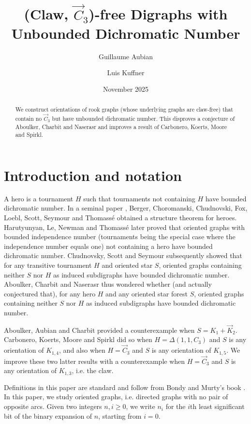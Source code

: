 \documentclass{amsart}
\title{(Claw, $\vec C_3$)-free Digraphs with Unbounded Dichromatic Number}
\author{Guillaume Aubian}
\author{Luis Kuffner}
\date{November 2025}
\begin{document}
\maketitle


\begin{abstract}
We construct orientations of rook graphs (whose underlying graphs are claw-free) that contain no $\vec C_3$ but have unbounded dichromatic number. This disproves a conjecture of Aboulker, Charbit and Naserasr and improves a result of Carbonero, Koerts, Moore and Spirkl.
\end{abstract}


\section{Introduction and notation}



A hero is a tournament $H$ such that tournaments not containing $H$ have bounded dichromatic number. In a seminal paper \cite{BCCFLSST13}, Berger, Choromanski, Chudnovski, Fox, Loebl, Scott, Seymour and Thomassé obtained a structure theorem for heroes. Harutyunyan, Le, Newman and Thomassé \cite{HLNT17} later proved that oriented graphs with bounded independence number (tournaments being the special case where the independence number equals one) not containing a hero have bounded dichromatic number. Chudnovsky, Scott and Seymour \cite{CSS19} subsequently showed that for any transitive tournament $H$ and oriented star $S$, oriented graphs containing neither $S$ nor $H$ as induced subdigraphs have bounded dichromatic number. Aboulker, Charbit and Naserasr \cite{ACN21} thus wondered whether (and actually conjectured that), for any hero $H$ and any oriented star forest $S$, oriented graphs containing neither $S$ nor $H$ as induced subdigraphs have bounded dichromatic number.

\smallskip{}

Aboulker, Aubian and Charbit \cite{AAC24} provided a counterexample when $S = K_1 + \vec K_2$. Carbonero, Koerts, Moore and Spirkl \cite{CKMS25} did so when $H = \Delta(1,1,C_3)$ and $S$ is any orientation of $K_{1,4}$, and also when $H = \vec C_3$ and $S$ is any orientation of $K_{1,5}$. We improve these two latter results with a counterexample when $H = \vec C_3$ and $S$ is any orientation of $K_{1,3}$, i.e. the claw.

\bigskip{}

Definitions in this paper are standard and follow from Bondy and Murty's book \cite{BM08}. In this paper, we study oriented graphs, i.e. directed graphs with no pair of opposite arcs. Given two integers $n,i \ge 0$, we write $n_i$ for the $i$th least significant bit of the binary expansion of $n$, starting from $i=0$.
\end{document}
